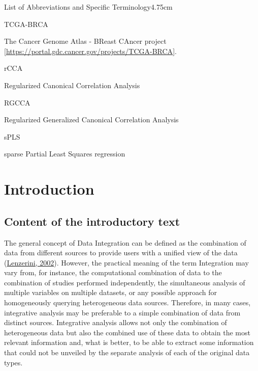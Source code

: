 \documentclass[a4paper, nobind]{templates/ociamthesis}
\renewcommand{\chaptermark}[1]{\markboth{\thechapter. #1}{\thechapter. #1}}
\begin{document}
\begin{romanpages}
\begin{mclistof}{List of Abbreviations and Specific Terminology}{4.75cm}
\item[TCGA-BRCA]

The Cancer Genome Atlas - BReast CAncer project {[}\url{https://portal.gdc.cancer.gov/projects/TCGA-BRCA}{]}.

\item[rCCA]

Regularized Canonical Correlation Analysis

\item[RGCCA]

Regularized Generalized Canonical Correlation Analysis

\item[sPLS]

sparse Partial Least Squares regression

\end{mclistof} 


\end{romanpages}

\flushbottom

\hypertarget{intro}{%
\chapter{Introduction}\label{intro}}

\chaptermark{Introduction}

\minitoc 

\hypertarget{content-of-the-introductory-text}{%
\section{Content of the introductory text}\label{content-of-the-introductory-text}}

The general concept of Data Integration can be defined as the combination of data from different sources to provide users with a unified view of the data (\protect\hyperlink{ref-lenzerini_data_2002}{Lenzerini, 2002}). However, the practical meaning of the term Integration may vary from, for instance, the computational combination of data to the combination of studies performed independently, the simultaneous analysis of multiple variables on multiple datasets, or any possible approach for homogeneously querying heterogeneous data sources. Therefore, in many cases, integrative analysis may be preferable to a simple combination of data from distinct sources. Integrative analysis allows not only the combination of heterogeneous data but also the combined use of these data to obtain the most relevant information and, what is better, to be able to extract some information that could not be unveiled by the separate analysis of each of the original data types.
\end{document}
